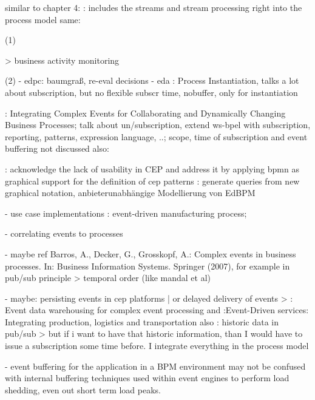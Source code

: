 similar to chapter 4:
\cite{appel2014modeling}: includes the streams and stream processing right into the process model
same: \cite{biornstad2006control}




(1)

> business activity monitoring



(2)
- edpc: baumgraß, re-eval decisions
- eda
\cite{decker2008instantiation}: Process Instantiation, talks a lot about subscription, but no flexible subscr time, nobuffer, only for instantiation

\cite{von2010integrating}: Integrating Complex Events for Collaborating and Dynamically Changing Business Processes; talk about un/subscription, extend ws-bpel with subscription, reporting, patterns, expression language, ..; scope, time of subscription and event buffering not discussed
also: \cite{juric2010wsdl}

\cite{Kunz2010}: acknowledge the lack of usability in CEP and address it by applying bpmn as graphical support for the definition of cep patterns
\cite{gabriel2016konzeptionelle}: generate queries from new graphical notation, anbieterunabhängige Modellierung von EdBPM


- use case implementations
\cite{estruch2012event}: event-driven manufacturing process; 


- correlating events to processes

- maybe ref Barros, A., Decker, G., Grosskopf, A.: Complex events in business processes. In: Business Information Systems. Springer (2007), for example in pub/sub principle > temporal order (like mandal et al)

- maybe: persisting events in cep platforms | or delayed delivery of events
> \cite{roth2010event}: Event data warehousing for complex event processing and \cite{buchmann2010event}:Event-Driven services: Integrating production, logistics and transportation
also \cite{li2007historic}: historic data in pub/sub
> but if i want to have that historic information, than I would have to issue a subscription some time before. I integrate everything in the process model

- event buffering for the application in a BPM environment may not be confused with internal buffering techniques used within event engines to perform load shedding, even out short term load peaks. 

